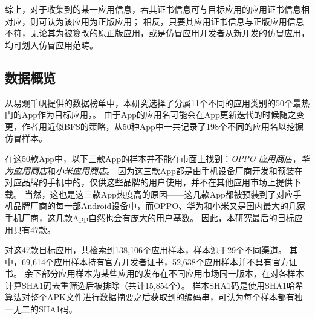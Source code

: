 综上，对于收集到的某一应用信息，若其证书信息可与目标应用的应用证书信息相对应，则可认为该应用为正版应用；
相反，只要其应用证书信息与正版应用信息不符，无论其为被篡改的原正版应用，或是仿冒应用开发者从新开发的仿冒应用，均可划入仿冒应用范畴。


\subsection{数据概览}
\label{sec:data_overview}


从易观千帆提供的数据榜单中，本研究选择了分属11个不同的应用类别的50个最热门的App作为目标应用，。
由于App的应用名可能会在App更新迭代的时候随之变更，作者用近似BFS的策略，从50种App中一共记录了198个不同的应用名以挖掘仿冒样本。

在这50款App中，以下三款App的样本并不能在市面上找到：\emph{OPPO 应用商店}，\emph{华为应用商店}和\emph{小米应用商店}。
因为这三款App都是由手机设备厂商开发和预装在对应品牌的手机中的，仅供这些品牌的用户使用，并不在其他应用市场上提供下载。
当然，这也是这三款App热度高的原因——这几款App都被预装到了对应手机品牌厂商的每一部Android设备中，而OPPO、华为和小米又是国内最大的几家手机厂商，这几款App自然也会有庞大的用户基数。
因此，本研究最后的目标应用只有47款。

对这47款目标应用，\mytool 共检索到138,106个应用样本，样本源于29个不同渠道。
其中，69,614个应用样本持有官方开发者证书，52,638个应用样本并不具有官方证书。
余下部分应用样本为某些应用的发布在不同应用市场同一版本，在对各样本计算SHA1码去重筛选后被排除（共计15,854个）。
样本SHA1码是使用SHA1哈希算法对整个APK文件进行数据摘要之后获取到的编码串，可认为每个样本都有独一无二的SHA1码。



